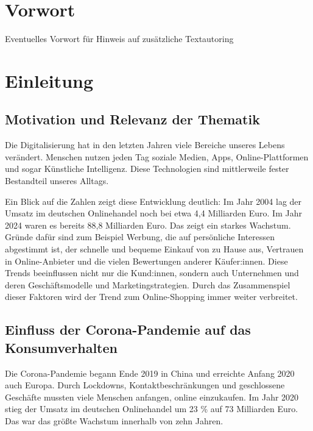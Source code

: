 \section{Vorwort}
Eventuelles Vorwort für Hinweis auf zusätzliche Textautoring


\section{Einleitung}
\subsection{Motivation und Relevanz der Thematik}
Die Digitalisierung hat in den letzten Jahren viele Bereiche unseres Lebens verändert. Menschen nutzen jeden Tag soziale Medien, Apps, Online-Plattformen und sogar Künstliche Intelligenz. Diese Technologien sind mittlerweile fester Bestandteil unseres Alltags. 

Ein Blick auf die Zahlen zeigt diese Entwicklung deutlich: Im Jahr 2004 lag der Umsatz im deutschen Onlinehandel noch bei etwa 4,4 Milliarden Euro. Im Jahr 2024 waren es bereits 88,8 Milliarden Euro. Das zeigt ein starkes Wachstum. Gründe dafür sind zum Beispiel Werbung, die auf persönliche Interessen abgestimmt ist, der schnelle und bequeme Einkauf von zu Hause aus, Vertrauen in Online-Anbieter und die vielen Bewertungen anderer Käufer:innen. Diese Trends beeinflussen nicht nur die Kund:innen, sondern auch Unternehmen und deren Geschäftsmodelle und Marketingstrategien. Durch das Zusammenspiel dieser Faktoren wird der Trend zum Online-Shopping immer weiter verbreitet. 

\subsection{Einfluss der Corona-Pandemie auf das Konsumverhalten}
Die Corona-Pandemie begann Ende 2019 in China und erreichte Anfang 2020 auch Europa. Durch Lockdowns, Kontaktbeschränkungen und geschlossene Geschäfte mussten viele Menschen anfangen, online einzukaufen. Im Jahr 2020 stieg der Umsatz im deutschen Onlinehandel um 23 \% auf 73 Milliarden Euro. Das war das größte Wachstum innerhalb von zehn Jahren. 

